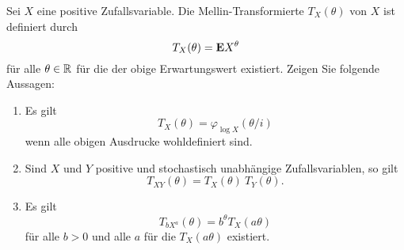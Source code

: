  Sei $X$ eine positive Zufallsvariable.
Die Mellin-Transformierte $T_{X}(\theta)$ von $X$ ist definiert durch
\begin{equation*}
    T_{X}(\theta) = \mathbf E X^{\theta}
\end{equation*}
für alle $\theta\in\mathbb R$ für die der obige Erwartungswert existiert. Zeigen Sie
folgende Aussagen:
\begin{enumerate}
    \item Es gilt
        \begin{equation*}
            T_{X}(\theta) = \varphi_{ \log X} (\theta/i)
        \end{equation*}
        wenn alle obigen Ausdrucke wohldefiniert sind.
    \item Sind $X$ und $Y$ positive und stochastisch unabhängige Zufallsvariablen, so gilt
        \begin{equation*}
            T_{XY}(\theta) = T_{X}(\theta) \ T_{Y}(\theta). 
        \end{equation*}
    \item Es gilt
        \begin{equation*}
            T_{b X^{a}}(\theta) = b^{\theta} T_{X} (a\theta)
        \end{equation*}
        für alle $b>0$ und alle $a$ für die $T_{X}(a\theta)$ existiert. 
\end{enumerate}


